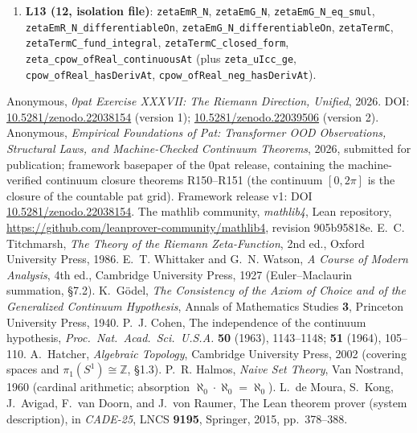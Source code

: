 \documentclass{article}
\begin{document}
{\begin{sloppypar}
\begin{enumerate}
\texttt{net\_flip\_from\_chi\_lift}, \texttt{flip\_count\_from\_theta\_lifts},
\texttt{completedZeta}\(_0\)\_log\_reflection,
\texttt{zeta\_zero\_iff\_completedZeta}\(_0\)\_one\_over\_sum,
\texttt{zeta\_line\_two\_bounded}, \texttt{Gamma\_one\_add\_it\_norm\_le\_one},
\texttt{zeta\_ne\_zero\_on\_bottom\_edge}, \texttt{zeta\_im\_zero\_on\_real},
\texttt{zeta\_neg\_one\_re\_neg}, \texttt{bottom\_edge\_arg\_jump},
\texttt{zeta\_partial\_sum\_lt\_integral\_bound}.
\item \textbf{L13 (12, isolation file)}: \texttt{zetaEmR\_N},
\texttt{zetaEmG\_N}, \texttt{zetaEmG\_N\_eq\_smul},
\texttt{zetaEmR\_N\_differentiableOn}, \texttt{zetaEmG\_N\_differentiableOn},
\texttt{zetaTermC}, \texttt{zetaTermC\_fund\_integral},
\texttt{zetaTermC\_closed\_form}, \texttt{zeta\_cpow\_ofReal\_continuousAt}
(plus \texttt{zeta\_uIcc\_ge}, \texttt{cpow\_ofReal\_hasDerivAt},
\texttt{cpow\_ofReal\_neg\_hasDerivAt}).
\end{enumerate}
\end{sloppypar}}

\begin{thebibliography}{9}
Anonymous, \emph{0pat Exercise XXXVII: The Riemann Direction, Unified},
2026. DOI:
\href{https://doi.org/10.5281/zenodo.22038154}{10.5281/zenodo.22038154}
(version 1); \href{https://doi.org/10.5281/zenodo.22039506}{10.5281/zenodo.22039506} (version 2).
Anonymous, \emph{Empirical Foundations of Pat: Transformer OOD Observations,
Structural Laws, and Machine-Checked Continuum Theorems}, 2026, submitted
for publication; framework basepaper of the 0pat release, containing the
machine-verified continuum closure theorems R150--R151 (the continuum
$[0,2\pi]$ is the closure of the countable pat grid). Framework release
v1: DOI
\href{https://doi.org/10.5281/zenodo.22038154}{10.5281/zenodo.22038154}.
The mathlib community, \emph{mathlib4}, Lean repository,
\url{https://github.com/leanprover-community/mathlib4}, revision 905b95818e.
E.~C. Titchmarsh, \emph{The Theory of the Riemann Zeta-Function}, 2nd ed.,
Oxford University Press, 1986.
E.~T. Whittaker and G.~N. Watson, \emph{A Course of Modern Analysis}, 4th ed.,
Cambridge University Press, 1927 (Euler--Maclaurin summation, \S7.2).
K.~G\"odel, \emph{The Consistency of the Axiom of Choice and of the
Generalized Continuum Hypothesis}, Annals of Mathematics Studies \textbf{3},
Princeton University Press, 1940.
P.~J. Cohen, The independence of the continuum hypothesis,
\emph{Proc.\ Nat.\ Acad.\ Sci.\ U.S.A.} \textbf{50} (1963), 1143--1148;
\textbf{51} (1964), 105--110.
A.~Hatcher, \emph{Algebraic Topology}, Cambridge University Press, 2002
(covering spaces and $\pi_1(S^1)\cong\mathbb Z$, \S1.3).
P.~R. Halmos, \emph{Naive Set Theory}, Van Nostrand, 1960
(cardinal arithmetic; absorption $\aleph_0\cdot\aleph_0=\aleph_0$).
L.~de Moura, S.~Kong, J.~Avigad, F.~van Doorn, and J.~von Raumer,
The Lean theorem prover (system description), in \emph{CADE-25},
LNCS \textbf{9195}, Springer, 2015, pp.~378--388.
\end{thebibliography}
\end{document}

